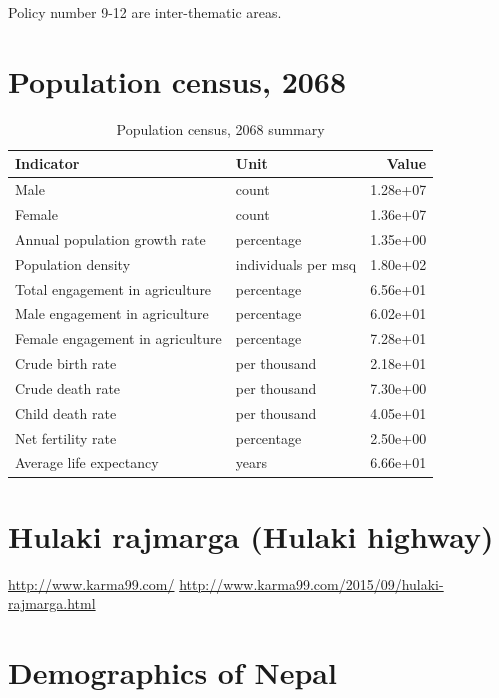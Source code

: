 \documentclass[
  openany]{book}
\begin{document}
Policy number 9-12 are inter-thematic areas.

\hypertarget{population-census-2068}{%
\section{Population census, 2068}\label{population-census-2068}}

\begin{longtable}[t]{llr}
\caption{\label{tab:unnamed-chunk-5}Population census, 2068 summary}\\
\toprule
Indicator & Unit & Value\\
\midrule
\rowcolor{gray!6}  Male & count & 1.28e+07\\
Female & count & 1.36e+07\\
\rowcolor{gray!6}  Annual population growth rate & percentage & 1.35e+00\\
Population density & individuals per msq & 1.80e+02\\
\rowcolor{gray!6}  Total engagement in agriculture & percentage & 6.56e+01\\
\addlinespace
Male engagement in agriculture & percentage & 6.02e+01\\
\rowcolor{gray!6}  Female engagement in agriculture & percentage & 7.28e+01\\
Crude birth rate & per thousand & 2.18e+01\\
\rowcolor{gray!6}  Crude death rate & per thousand & 7.30e+00\\
Child death rate & per thousand & 4.05e+01\\
\addlinespace
\rowcolor{gray!6}  Net fertility rate & percentage & 2.50e+00\\
Average life expectancy & years & 6.66e+01\\
\bottomrule
\end{longtable}

\hypertarget{hulaki-rajmarga-hulaki-highway}{%
\section{Hulaki rajmarga (Hulaki highway)}\label{hulaki-rajmarga-hulaki-highway}}

\url{http://www.karma99.com/}
\url{http://www.karma99.com/2015/09/hulaki-rajmarga.html}

\hypertarget{demographics-of-nepal}{%
\section{Demographics of Nepal}\label{demographics-of-nepal}}
\end{document}
